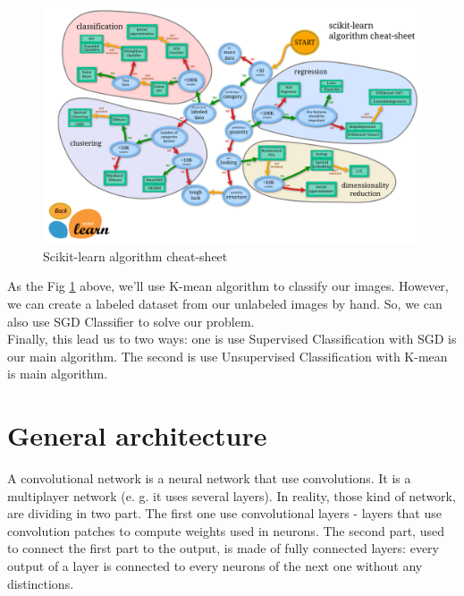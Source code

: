 \documentclass[hidelinks,12pt,a4paper]{report}
\begin{document}
\begin{figure}[ht]
	\includegraphics[width=\textwidth, center]{images/scikit-learn}
	\caption{Scikit-learn algorithm cheat-sheet}
	\label{fig:Scikit-learn}
\end{figure}
As the Fig \ref{fig:Scikit-learn} above, we'll use K-mean algorithm to classify our images. However, we can create a labeled dataset from our unlabeled images by hand. So, we can also use SGD Classifier to solve our problem.
\\
Finally, this lead us to two ways: one is use Supervised Classification with SGD is our main algorithm. The second is use Unsupervised Classification with K-mean is main algorithm.
\section{General architecture}
A convolutional network is a neural network that use convolutions. It is a multiplayer network (e. g. it uses several layers). In reality, those kind of network, are dividing in two part. The first one use convolutional layers - layers that use convolution patches to compute weights used in neurons. The second part, used to connect the first part to the output, is made of fully connected layers: every output of a layer is connected to every neurons of the next one without any distinctions.
\end{document}
